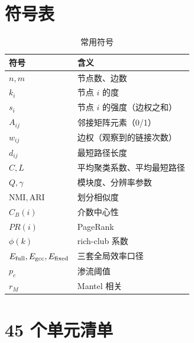 \appendix

\section{符号表}

\begin{table}[H]
\centering
\caption{常用符号}
\begin{tabularx}{\textwidth}{@{}p{}X@{}}
\toprule
符号 & 含义 \\
\midrule
\(n,m\) & 节点数、边数 \\
\(k_i\) & 节点 \(i\) 的度 \\
\(s_i\) & 节点 \(i\) 的强度（边权之和） \\
\(A_{ij}\) & 邻接矩阵元素（0/1） \\
\(w_{ij}\) & 边权（观察到的链接次数） \\
\(d_{ij}\) & 最短路径长度 \\
\(C,L\) & 平均聚类系数、平均最短路径 \\
\(Q,\gamma\) & 模块度、分辨率参数 \\
\(\mathrm{NMI},\mathrm{ARI}\) & 划分相似度 \\
\(C_B(i)\) & 介数中心性 \\
\(PR(i)\) & PageRank \\
\(\phi(k)\) & rich-club 系数 \\
\(E_{\mathrm{full}},E_{\mathrm{gcc}},E_{\mathrm{fixed}}\) & 三套全局效率口径 \\
\(p_c\) & 渗流阈值 \\
\(r_M\) & Mantel 相关 \\
\bottomrule
\end{tabularx}
\end{table}

\section{45 个单元清单}

